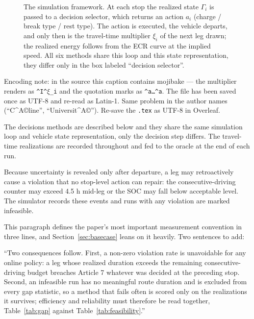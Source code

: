 \begin{figure} [h!]
    \centering
    \caption{The simulation framework. At each stop the realized state $\Gamma_i$ is passed to a decision selector, which returns an action $a_i$ (charge / break type / rest type). The action is executed, the vehicle departs, and only then is the travel-time multiplier $\xi_i$ of the next leg drawn; the realized energy follows from the ECR curve at the implied speed. All six methods share this loop and this state representation, they differ only in the box labeled ``decision selector''.}
    \label{fig:simulation_decision_selector}
\end{figure}

\begin{acmt}
Encoding note: in the source this caption contains mojibake --- the multiplier
renders as \texttt{\^{}I\^{}$\xi$\_i} and the quotation marks as
\texttt{\^{}a\dots\^{}a}. The file has been saved once as UTF-8 and re-read as
Latin-1. Same problem in the author names (``C\^{}A\copyright line'',
``Universit\^{}A\copyright''). Re-save the \texttt{.tex} as UTF-8 in Overleaf.
\end{acmt}

The decisions methods are described below and they share the same simulation loop and vehicle state representation, only the decision step differs. The travel-time realizations are recorded throughout and fed to the oracle at the end of each run.

Because uncertainty is revealed only after departure, a leg may retroactively cause a violation that no stop-level action can repair: the consecutive-driving counter may exceed 4.5 h mid-leg or the SOC may fall below acceptable level. The simulator records these events and runs with any violation are marked infeasible.

\begin{anew}
This paragraph defines the paper's most important measurement convention in three
lines, and Section~\ref{sec:basecase} leans on it heavily. Two sentences to add:

\medskip
``Two consequences follow. First, a non-zero violation rate is unavoidable for any
online policy: a leg whose realized duration exceeds the remaining
consecutive-driving budget breaches Article 7 whatever was decided at the
preceding stop. Second, an infeasible run has no meaningful route duration and is
excluded from every gap statistic, so a method that fails often is scored only on
the realizations it survives; efficiency and reliability must therefore be read
together, Table~\ref{tab:gap} against Table~\ref{tab:feasibility}.''
\end{anew}

